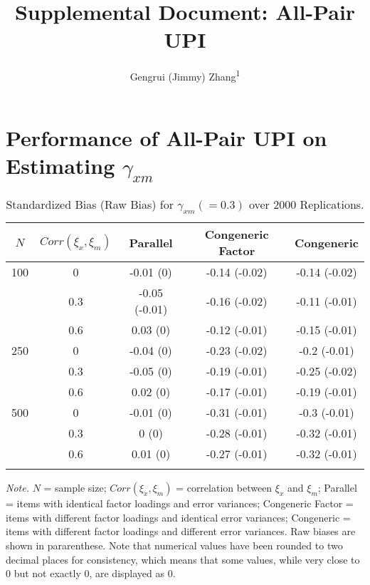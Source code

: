 \documentclass[
  man]{apa6}
\title{Supplemental Document: All-Pair UPI}
\author{Gengrui (Jimmy) Zhang\textsuperscript{1}}
\date{}
\affiliation{\vspace{0.5cm}\textsuperscript{1} University of Southhern California}
\begin{document}
\maketitle

\hypertarget{performance-of-all-pair-upi-on-estimating-gamma_xm}{%
\section{\texorpdfstring{Performance of All-Pair UPI on Estimating \(\gamma_{xm}\)}{Performance of All-Pair UPI on Estimating \textbackslash gamma\_\{xm\}}}\label{performance-of-all-pair-upi-on-estimating-gamma_xm}}

\begin{table}[tbp]

\begin{center}
\begin{threeparttable}

\caption{\label{tab:standardized bias (raw bias)}Standardized Bias (Raw Bias) for $\gamma_{xm} (= 0.3)$ over 2000 Replications.}

\begin{tabular}{ccccc}
\toprule
$\textit{N}$ & \multicolumn{1}{c}{$Corr(\xi_{x}, \xi_{m})$} & \multicolumn{1}{c}{Parallel} & \multicolumn{1}{c}{Congeneric Factor} & \multicolumn{1}{c}{Congeneric}\\
\midrule
100 & 0 & -0.01 (0) & -0.14 (-0.02) & -0.14 (-0.02)\\
 & 0.3 & -0.05 (-0.01) & -0.16 (-0.02) & -0.11 (-0.01)\\
 & 0.6 & 0.03 (0) & -0.12 (-0.01) & -0.15 (-0.01)\\
250 & 0 & -0.04 (0) & -0.23 (-0.02) & -0.2 (-0.01)\\
 & 0.3 & -0.05 (0) & -0.19 (-0.01) & -0.25 (-0.02)\\
 & 0.6 & 0.02 (0) & -0.17 (-0.01) & -0.19 (-0.01)\\
500 & 0 & -0.01 (0) & -0.31 (-0.01) & -0.3 (-0.01)\\
 & 0.3 & 0 (0) & -0.28 (-0.01) & -0.32 (-0.01)\\
 & 0.6 & 0.01 (0) & -0.27 (-0.01) & -0.32 (-0.01)\\
\bottomrule
\addlinespace
\end{tabular}

\begin{tablenotes}[para]
\normalsize{\textit{Note.} $\textit{N}$ = sample size; $Corr(\xi_{x}, \xi_{m})$ = correlation between $\xi_{x}$ and $\xi_{m}$; Parallel = items with identical factor loadings and error variances; Congeneric Factor = items with different factor loadings and identical error variances; Congeneric = items with different factor loadings and different error variances. Raw biases are shown in pararenthese. Note that numerical values have been rounded to two decimal places for consistency, which means that some values, while very close to 0 but not exactly 0, are displayed as 0.}
\end{tablenotes}

\end{threeparttable}
\end{center}

\end{table}
\end{document}
